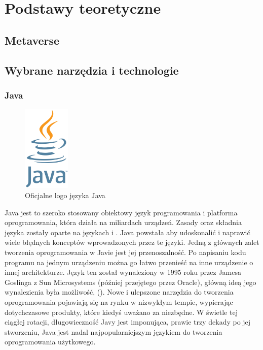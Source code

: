 
\chapter{Podstawy teoretyczne}
\section{Metaverse}


\section{Wybrane narzędzia i technologie}
\subsection{Java}

\begin{figure}[!htbp]
    \centering
    \includegraphics[width=0.2\textwidth]{images/javaLogo.png}
    \caption{Oficjalne logo języka Java}
    \label{fig:enter-label}
\end{figure}

Java jest to szeroko stosowany obiektowy język programowania i platforma oprogramowania, która działa na miliardach urządzeń. Zasady oraz składnia języka zostały oparte na językach  i . Java powstała aby udoskonalić i naprawić wiele błędnych konceptów wprowadzonych przez te języki. Jedną z głównych zalet tworzenia oprogramowania w Javie jest jej przenoszalność. Po napisaniu kodu programu na jednym urządzeniu można go łatwo przenieść na inne urządzenie o innej architekturze. Język ten został wynaleziony w 1995 roku przez Jamesa Goslinga z Sun Microsystems (później przejętego przez Oracle), główną ideą jego wynalezienia była możliwość,   (). Nowe i ulepszone narzędzia do tworzenia oprogramowania pojawiają się na rynku w nizwykłym tempie, wypierając dotychczasowe produkty, które kiedyś uważano za niezbędne. W świetle tej ciągłej rotacji, długowieczność Javy jest imponująca, prawie trzy dekady po jej stworzeniu, Java jest nadal najpopularniejszym językiem do tworzenia oprogramowania użytkowego\cite{javaIBM}\cite{javaDEV}.

